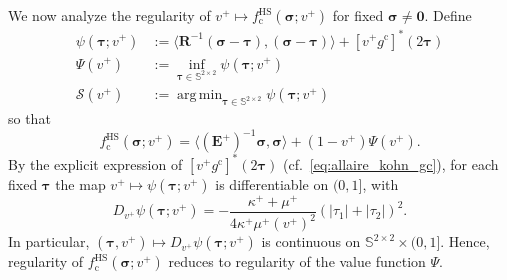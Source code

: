 \documentclass[preprint,3p]{elsarticle}
\newcommand{\tenss}[1]{\bm{\mathbf{#1}}}            %
\newcommand{\tensf}[1]{\bm{\mathbf{#1}}}            %
\newcommand{\stress}{\tenss{\sigma}}                %
\newcommand{\Emax}{\tensf{E}^{+}}                   %
\DeclareMathOperator*{\argmin}{arg\,min}
\begin{document}
We now analyze the regularity of $v^+\mapsto f_{\mathrm{c}}^{\mathrm{HS}}(\stress;v^+)$ for fixed $\stress\neq \tenss{0}$. Define
%
\begin{align}
    \psi(\tenss{\tau};v^+)&:=\langle\tensf{R}^{-1}(\stress-\tenss{\tau}),(\stress-\tenss{\tau})\rangle+[v^+ g^\mathrm{c}]^*(2\tenss{\tau})\\
    \Psi(v^+)&:=\inf_{\tenss{\tau}\in\mathbb{S}^{2\times 2}}\psi(\tenss{\tau};v^+)\\
    \mathcal{S}(v^+)&:=\argmin_{\tenss{\tau}\in\mathbb{S}^{2\times 2}}\psi(\tenss{\tau};v^+)
\end{align}
%
so that
%
\begin{equation}
    f_{\mathrm{c}}^{\mathrm{HS}}(\stress;v^+)=\langle(\Emax)^{-1}\stress,\stress\rangle+(1-v^+)\Psi(v^+).
\label{eq:burzain_valuefunction}
\end{equation}
%
By the explicit expression of $[v^+ g^\mathrm{c}]^*(2\tenss{\tau})$ (cf.\ \eqref{eq:allaire_kohn_gc}), for each fixed $\tenss{\tau}$ the map $v^+\mapsto \psi(\tenss{\tau};v^+)$ is differentiable on $(0,1]$, with
%
\begin{equation}
    D_{v^+} \psi(\tenss{\tau};v^+)=-\frac{\kappa^++\mu^+}{4\kappa^+\mu^+(v^+)^2}(\lvert\tau_1\rvert+\lvert\tau_2\rvert)^2.
\end{equation}
%
In particular, $(\tenss{\tau},v^+)\mapsto D_{v^+}\psi(\tenss{\tau};v^+)$ is continuous on $\mathbb{S}^{2 \times 2}\times (0,1]$. Hence, regularity of $f_{\mathrm{c}}^{\mathrm{HS}}(\stress;v^+)$ reduces to regularity of the value function $\Psi$.
\end{document}
